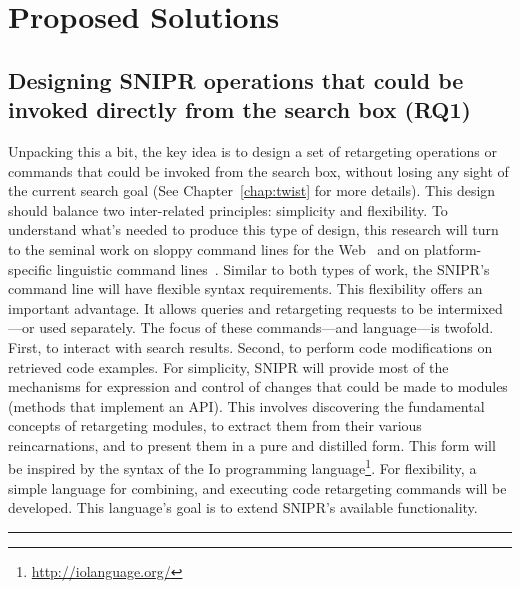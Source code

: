 \chapter{Proposed Solutions}{}
\label{sec:solutions}

\section{Designing \uppercase{SnipR} operations that could be invoked directly from the search box (RQ1)}
\label{sec:rq1}
Unpacking this a bit, the key idea is to design a set of retargeting operations or commands that could be invoked from the search box, without losing any sight of the current search goal (See Chapter~\ref{chap:twist} for more details). This design should balance two inter-related principles: simplicity and flexibility. To understand what's needed to produce this type of design, this research will turn to the seminal work on sloppy command lines for the Web~\cite{Little:2007dh, Miller:2008ge} and on platform-specific linguistic command lines~\cite{Raskin:2008wb}. Similar to both types of work, the \uppercase{SnipR}'s command line will have flexible syntax requirements. This flexibility offers an important advantage. It allows queries and retargeting requests to be intermixed---or used separately. The focus of these commands---and language---is twofold. First, to interact with search results. Second, to perform code modifications on retrieved code examples. For simplicity, SNIPR will provide most of the mechanisms for expression and control of changes that could be made to modules (methods that implement an API). This involves discovering the fundamental concepts of retargeting modules, to extract them from their various reincarnations, and to present them in a pure and distilled form. This form will be inspired by the syntax of the Io programming language\footnote{\url{http://iolanguage.org/}}. For flexibility, a simple language for combining, and executing code retargeting commands will be developed. This language's goal is to extend \uppercase{SnipR}'s available functionality. 

\fancybreak{\pfbreakdisplay}

